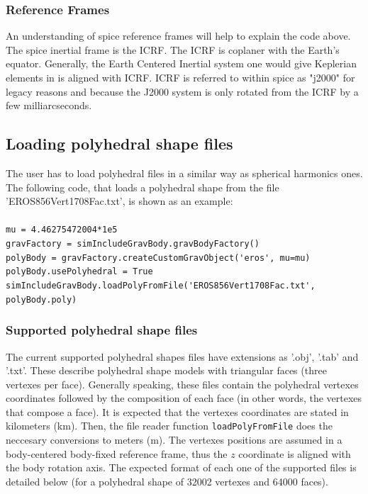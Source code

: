\subsubsection{Reference Frames}
An understanding of spice reference frames will help to explain the code above. The spice inertial frame is the ICRF. The ICRF is coplaner with the Earth's equator. Generally, the Earth Centered Inertial system one would give Keplerian elements in is aligned with ICRF. ICRF is referred to within spice as "j2000" for legacy reasons and because the J2000 system is only rotated from the ICRF by a few milliarcseconds.

\subsection{Loading polyhedral shape files}

The user has to load polyhedral files in a similar way as spherical harmonics ones. The following code, that loads a polyhedral shape from the file 'EROS856Vert1708Fac.txt', is shown as an example: \\\\
\verb|mu = 4.46275472004*1e5|\\
\verb|gravFactory = simIncludeGravBody.gravBodyFactory()|\\
\verb|polyBody = gravFactory.createCustomGravObject('eros', mu=mu)|\\
\verb|polyBody.usePolyhedral = True|\\
\verb|simIncludeGravBody.loadPolyFromFile('EROS856Vert1708Fac.txt', polyBody.poly)|\\

\subsubsection{Supported polyhedral shape files}

The current supported polyhedral shapes files have extensions as '.obj', '.tab' and '.txt'. These describe polyhedral shape models with triangular faces (three vertexes per face). Generally speaking, these files contain the polyhedral vertexes coordinates followed by the composition of each face (in other words, the vertexes that compose a face). It is expected that the vertexes coordinates are stated in kilometers (km). Then, the file reader function \verb|loadPolyFromFile| does the neccesary conversions to meters (m). The vertexes positions are assumed in a body-centered body-fixed reference frame, thus the $z$ coordinate is aligned with the body rotation axis. The expected format of each one of the supported files is detailed below (for a polyhedral shape of 32002 vertexes and 64000 faces).\\


